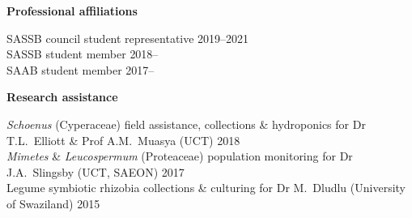 \documentclass[10pt]{article}
\begin{document}
\begin{multicols}{2}
\textbf{Professional affiliations} %

SASSB council student representative               \hfill {\small 2019--2021} \\
SASSB student member                               \hfill {\small 2018--    } \\
SAAB student member                                \hfill {\small 2017--    } \\

\end{multicols} %

\textbf{Research assistance} %

\textit{Schoenus} (Cyperaceae)
  field assistance, collections \& hydroponics
  for Dr T.L.~Elliott \& Prof A.M.~Muasya
  {\small (UCT)}                                         \hfill {\small 2018} \\
\textit{Mimetes} \& \textit{Leucospermum} (Proteaceae)
  population monitoring
  for Dr J.A.~Slingsby
  {\small (UCT, SAEON)}                                  \hfill {\small 2017} \\
Legume symbiotic rhizobia
  collections \& culturing
  for Dr M.~Dludlu
  {\small (University of Swaziland)}                     \hfill {\small 2015}
\end{document}
